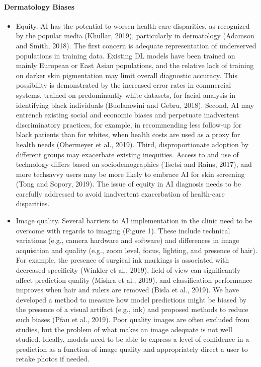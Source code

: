 \documentclass[12pt, a4paper, oneside]{book}   	%
\begin{document}
			\paragraph{Dermatology Biases}
			\begin{itemize}
				\item Equity. AI has the potential to worsen health-care disparities, as recognized by the popular media (Khullar, 2019), particularly in dermatology (Adamson and Smith, 2018). The first concern is adequate representation of underserved populations in training data. Existing DL models have been trained on mainly European or East Asian populations, and the relative lack of training on darker skin pigmentation may limit overall diagnostic accuracy. This possibility is demonstrated by the increased error rates in commercial systems, trained on predominantly white datasets, for facial analysis in identifying black individuals (Buolamwini and Gebru, 2018). Second, AI may entrench existing social and economic biases and perpetuate inadvertent discriminatory practices, for example, in recommending less follow-up for black patients than for whites, when health costs are used as a proxy for health needs (Obermeyer et al., 2019). Third, disproportionate adoption by different groups may exacerbate existing inequities. Access to and use of technology differs based on sociodemographics (Tsetsi and Rains, 2017), and more techsavvy users may be more likely to embrace AI for skin screening (Tong and Sopory, 2019). The issue of equity in AI diagnosis needs to be carefully addressed to avoid inadvertent exacerbation of health-care disparities. \autocite{Young_2020}
				\item Image quality. Several barriers to AI implementation in the clinic need to be overcome with regards to imaging (Figure 1). These include technical variations (e.g., camera hardware and software) and differences in image acquisition and quality (e.g., zoom level, focus, lighting, and presence of hair). For example, the presence of surgical ink markings is associated with decreased specificity (Winkler et al., 2019), field of view can significantly affect prediction quality (Mishra et al., 2019), and classification performance improves when hair and rulers are removed (Bisla et al., 2019). We have developed a method to measure how model predictions might be biased by the presence of a visual artifact (e.g., ink) and proposed methods to reduce such biases (Pfau et al., 2019). Poor quality images are often excluded from studies, but the problem of what makes an image adequate is not well studied. Ideally, models need to be able to express a level of confidence in a prediction as a function of image quality and appropriately direct a user to retake photos if needed. \autocite{Young_2020}

\end{itemize}
\end{document}
